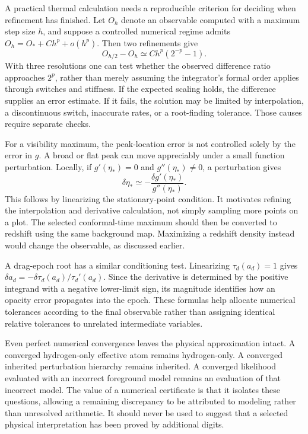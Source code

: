 A practical thermal calculation needs a reproducible criterion for deciding when refinement has finished. Let $O_h$ denote an observable computed with a maximum step size $h$, and suppose a controlled numerical regime admits $O_h=O_*+Ch^p+o(h^p)$. Then two refinements give
\begin{equation}
 O_{h/2}-O_h\simeq Ch^p(2^{-p}-1).
 \label{c9:convergence}
\end{equation}
With three resolutions one can test whether the observed difference ratio approaches $2^p$, rather than merely assuming the integrator's formal order applies through switches and stiffness. If the expected scaling holds, the difference supplies an error estimate. If it fails, the solution may be limited by interpolation, a discontinuous switch, inaccurate rates, or a root-finding tolerance. Those causes require separate checks.

For a visibility maximum, the peak-location error is not controlled solely by the error in $g$. A broad or flat peak can move appreciably under a small function perturbation. Locally, if $g'(\eta_*)=0$ and $g''(\eta_*)\ne0$, a perturbation gives
\begin{equation}
 \delta\eta_*\simeq-\frac{\delta g'(\eta_*)}{g''(\eta_*)}.
 \label{c9:peakconditioning}
\end{equation}
This follows by linearizing the stationary-point condition. It motivates refining the interpolation and derivative calculation, not simply sampling more points on a plot. The selected conformal-time maximum should then be converted to redshift using the same background map. Maximizing a redshift density instead would change the observable, as discussed earlier.

A drag-epoch root has a similar conditioning test. Linearizing $\tau_d(a_d)=1$ gives $\delta a_d=-\delta\tau_d(a_d)/\tau_d'(a_d)$. Since the derivative is determined by the positive integrand with a negative lower-limit sign, its magnitude identifies how an opacity error propagates into the epoch. These formulas help allocate numerical tolerances according to the final observable rather than assigning identical relative tolerances to unrelated intermediate variables.

Even perfect numerical convergence leaves the physical approximation intact. A converged hydrogen-only effective atom remains hydrogen-only. A converged inherited perturbation hierarchy remains inherited. A converged likelihood evaluated with an incorrect foreground model remains an evaluation of that incorrect model. The value of a numerical certificate is that it isolates these questions, allowing a remaining discrepancy to be attributed to modeling rather than unresolved arithmetic. It should never be used to suggest that a selected physical interpretation has been proved by additional digits.

